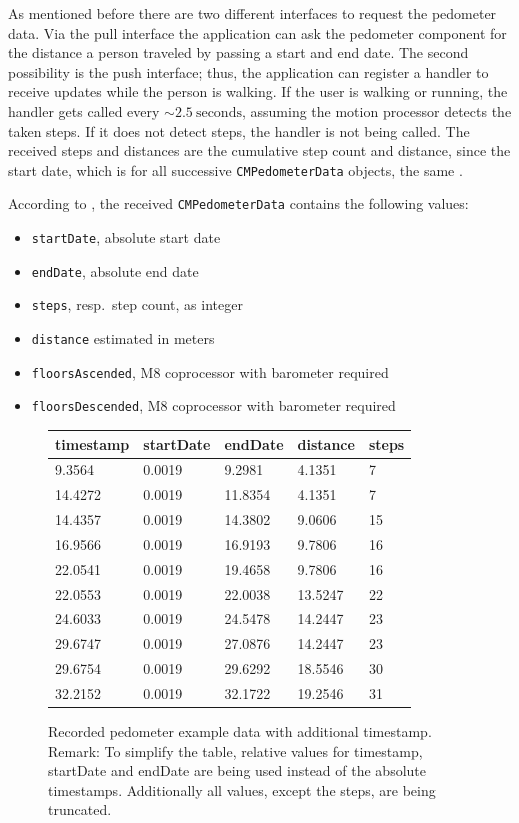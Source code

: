 As mentioned before there are two different interfaces to request the pedometer data. Via the pull interface the application can ask the pedometer component for the distance a person traveled by passing a start and end date. The second possibility is the push interface; thus, the application can register a handler to receive updates while the person is walking. If the user is walking or running, the handler gets called every $\sim 2.5~\text{seconds}$, assuming the motion processor detects the taken steps. If it does not detect steps, the handler is not being called. The received steps and distances are the cumulative step count and distance, since the start date, which is for all successive \texttt{CMPedometerData} objects, the same \citep{apple:wwdc_2014_pham}.

According to \citet{apple:ios_doc_cm}, the received \texttt{CMPedometerData} contains the following values:
\begin{itemize}
  \item \texttt{startDate}, absolute start date
  \item \texttt{endDate}, absolute end date
  \item \texttt{steps}, resp.\ step count, as integer
  \item \texttt{distance} estimated in meters
  \item \texttt{floorsAscended}, M8 coprocessor with barometer required
  \item \texttt{floorsDescended}, M8 coprocessor with barometer required
\end{itemize}

\begin{center}
\begin{figure}
\begin{tabular}{*{5}{l}}
timestamp & startDate & endDate & distance & steps\\
\hline
9.3564 & 0.0019 & 9.2981 & 4.1351 & 7\\
14.4272 & 0.0019 & 11.8354 & 4.1351 & 7\\
14.4357 & 0.0019 & 14.3802 & 9.0606 & 15\\
16.9566 & 0.0019 & 16.9193 & 9.7806 & 16\\
22.0541 & 0.0019 & 19.4658 & 9.7806 & 16\\
22.0553 & 0.0019 & 22.0038 & 13.5247 & 22\\
24.6033 & 0.0019 & 24.5478 & 14.2447 & 23\\
29.6747 & 0.0019 & 27.0876 & 14.2447 & 23\\
29.6754 & 0.0019 & 29.6292 & 18.5546 & 30\\
32.2152 & 0.0019 & 32.1722 & 19.2546 & 31\\
\end{tabular}
\caption{Recorded pedometer example data with additional timestamp.
Remark: To simplify the table, relative values for timestamp, startDate and endDate are being used instead of the absolute timestamps.
Additionally all values, except the steps, are being truncated.}
\label{fig:pedometerExampleData}
\end{figure}
\end{center}

